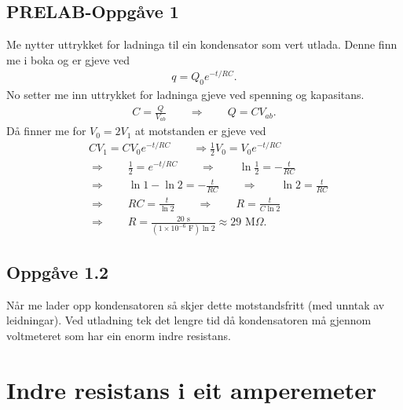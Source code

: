 \documentclass[11pt, a4paper]{article}
\begin{document}
  \subsection*{PRELAB-Oppgåve 1}
    Me nytter uttrykket for ladninga til ein kondensator som vert utlada. Denne finn me i boka og er gjeve ved
    \begin{align*}
      q = Q_0e^{-t/RC}.
    \end{align*}
    No setter me inn uttrykket for ladninga gjeve ved spenning og kapasitans.
    \begin{align*}
      C = \frac{Q}{V_{ab}} \qquad \Rightarrow \qquad Q = CV_{ab}.
    \end{align*}
    Då finner me for $V_0 = 2V_1$ at motstanden er gjeve ved
    \begin{align*}
      &CV_1 = CV_0e^{-t/RC} \qquad \Rightarrow \frac{1}{2}V_0 = V_0e^{-t/RC} \\
      &\Rightarrow \qquad \frac{1}{2} = e^{-t/RC} \qquad \Rightarrow \qquad \ln{\frac{1}{2}} = -\frac{t}{RC} \\
      &\Rightarrow \qquad \ln{1} - \ln{2} = -\frac{t}{RC} \qquad \Rightarrow \qquad \ln{2} = \frac{t}{RC} \\
      &\Rightarrow \qquad RC = \frac{t}{\ln{2}} \qquad \Rightarrow \qquad R = \frac{t}{C\ln{2}} \\
      &\Rightarrow \qquad R = \frac{20\text{ s}}{(1\times10^{-6}\text{ F})\ln{2}} \approx 29\text{ M}\Omega.
    \end{align*}

  \subsection*{Oppgåve 1.2}
    Når me lader opp kondensatoren så skjer dette motstandsfritt (med unntak av leidningar). Ved utladning tek det lengre tid då kondensatoren må gjennom voltmeteret som har ein 
    enorm indre resistans.




\newpage


\section*{Indre resistans i eit amperemeter}
\end{document}
